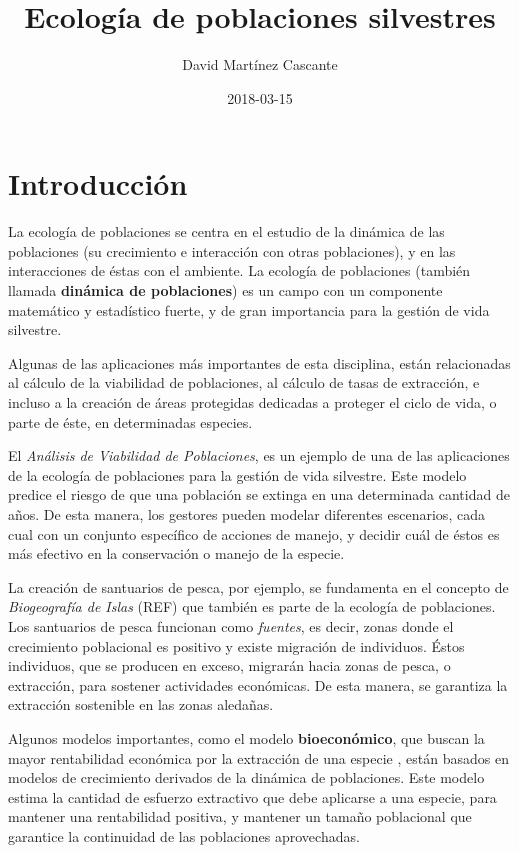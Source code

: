 \documentclass[12pt,letterpaper,]{book}
\title{Ecología de poblaciones silvestres}
\author{David Martínez Cascante}
\date{2018-03-15}
\begin{document}
\maketitle

{
\hypersetup{linkcolor=black}
\setcounter{tocdepth}{1}
\tableofcontents
}
\chapter{Introducción}\label{intro}

La ecología de poblaciones se centra en
el estudio de la dinámica de las
poblaciones (su crecimiento e
interacción con otras poblaciones), y en las interacciones de éstas con
el ambiente. La ecología de poblaciones (también llamada
\textbf{dinámica de poblaciones}) es un campo con un componente
matemático y estadístico fuerte, y de gran importancia para la gestión
de vida silvestre.

Algunas de las aplicaciones más importantes de esta disciplina, están
relacionadas al cálculo de la viabilidad de poblaciones, al cálculo de
tasas de extracción, e incluso a la creación de áreas protegidas
dedicadas a proteger el ciclo de vida, o parte de éste, en determinadas
especies.

El \emph{Análisis de Viabilidad de Poblaciones}, es un ejemplo de una de
las aplicaciones de la ecología de poblaciones para la gestión de vida
silvestre. Este modelo predice el riesgo de que una población se extinga
en una determinada cantidad de años. De esta manera, los gestores pueden
modelar diferentes escenarios, cada cual con un conjunto específico de
acciones de manejo, y decidir cuál de éstos es más efectivo en la
conservación o manejo de la especie.

La creación de santuarios de pesca, por ejemplo, se fundamenta en el
concepto de \emph{Biogeografía de Islas} (REF) que también es parte de
la ecología de poblaciones. Los santuarios de pesca funcionan como
\emph{fuentes}, es decir, zonas donde el crecimiento poblacional es
positivo y existe migración de individuos. Éstos individuos, que se
producen en exceso, migrarán hacia zonas de pesca, o extracción, para
sostener actividades económicas. De esta manera, se garantiza la
extracción sostenible en las zonas aledañas.

Algunos modelos importantes, como el modelo \textbf{bioeconómico}, que
buscan la mayor rentabilidad económica por la extracción de una especie
\citep{Grafton2006}, están basados en modelos de crecimiento derivados
de la dinámica de poblaciones. Este modelo estima la cantidad de
esfuerzo extractivo que debe aplicarse a una especie, para mantener una
rentabilidad positiva, y mantener un tamaño poblacional que garantice la
continuidad de las poblaciones aprovechadas.
\end{document}
